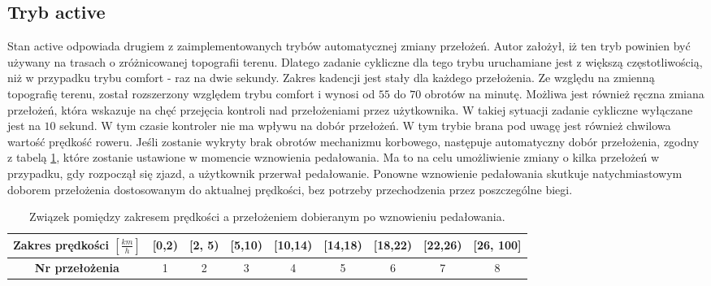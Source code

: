 \subsection{Tryb active}
Stan active odpowiada drugiem z zaimplementowanych trybów automatycznej zmiany przełożeń. Autor założył, iż ten tryb powinien być używany na trasach o zróżnicowanej topografii terenu. Dlatego zadanie cykliczne dla tego trybu uruchamiane jest z większą częstotliwością, niż w przypadku trybu comfort - raz na dwie sekundy. Zakres kadencji jest stały dla każdego przełożenia. Ze względu na zmienną topografię terenu, został rozszerzony względem trybu comfort i wynosi od $55$ do $70$ obrotów na minutę. Możliwa jest również ręczna zmiana przełożeń, która wskazuje na chęć przejęcia kontroli nad przełożeniami przez użytkownika. W takiej sytuacji zadanie cykliczne wyłączane jest na $10$ sekund. W tym czasie kontroler nie ma wpływu na dobór przełożeń. W tym trybie brana pod uwagę jest również chwilowa wartość prędkość roweru. Jeśli zostanie wykryty brak obrotów mechanizmu korbowego, następuje automatyczny dobór przełożenia, zgodny z tabelą \ref{tab:zakresOdPredkosci}, które zostanie ustawione w momencie wznowienia pedałowania. Ma to na celu umożliwienie zmiany o kilka przełożeń w przypadku, gdy rozpoczął się zjazd, a użytkownik przerwał pedałowanie. Ponowne wznowienie pedałowania skutkuje natychmiastowym doborem przełożenia dostosowanym do aktualnej prędkości, bez potrzeby przechodzenia przez poszczególne biegi. 
\begin{table}[h]
    \caption{Związek pomiędzy zakresem prędkości a przełożeniem dobieranym po wznowieniu pedałowania.}
    \begin{center}
		\label{tab:zakresOdPredkosci}
		\begin{tabular}{|c|c|c|c|c|c|c|c|c|}
 			\hline
 			\textbf{Zakres prędkości} $[\frac{km}{h}]$ & [0,2) & [2, 5) & [5,10) & [10,14) & [14,18) & [18,22) & [22,26) & [26, 100] \\
 			\hline
 			\textbf{Nr przełożenia} & 1 & 2 & 3 & 4 & 5 & 6 & 7 & 8 \\
			\hline
		\end{tabular}
	\end{center}
\end{table}

